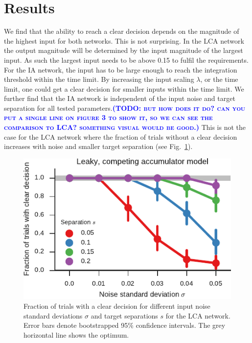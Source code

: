 \documentclass[10pt,letterpaper]{article}
\makeatletter
\newcommand{\todo}[1]{\textbf{\textsc{\textcolor{blue}{(TODO\@: #1)}}}}
\makeatother
\begin{document}
\section{Results}
We find that the ability to reach a clear decision depends on the magnitude of the highest input for both networks.
This is not surprising.
In the LCA network the output magnitude will be determined by the input magnitude of the largest input.
As such the largest input needs to be above 0.15 to fulfil the requirements.
For the IA network, the input has to be large enough to reach the integration threshold within the time limit.
By increasing the input scaling $\lambda$, or the time limit, one could get a clear decision for smaller inputs within the time limit.
We further find that the IA network is independent of the input noise and target separation for all tested parameters.\todo{but how does it do? can you put a single line on figure 3 to show it, so we can see the comparison to LCA? something visual would be good.}
This is not the case for the LCA network where the fraction of trials without a clear decision increases with noise and smaller target separation (see Fig.~\ref{fig:decisions}).
\begin{figure}
    \centering
    \includegraphics{figures/decisions}
    \caption{ \label{fig:decisions}
        Fraction of trials with a clear decision for different input noise standard deviations $\sigma$ and target separations $s$ for the LCA network.
        Error bars denote bootstrapped 95\% confidence intervals.
        The grey horizontal line shows the optimum.
    }
\end{figure}
\end{document}
